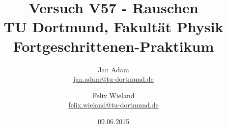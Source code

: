 



\title{Versuch V57 - Rauschen\\				%
\large TU Dortmund, Fakultät Physik\\ 
\normalsize Fortgeschrittenen-Praktikum}

\author{Jan Adam\\			%
{\small \href{jan.adam@tu-dortmund.de}{jan.adam@tu-dortmund.de}}	%
\and						%
Felix Wieland\\					%
{\small \href{felix.wieland@tu-dortmund.de}{felix.wieland@tu-dortmund.de}}		%
}
\date{09.06.2015}				%





\maketitle					%
\thispagestyle{empty} 				%



\tableofcontents


\newpage					%



